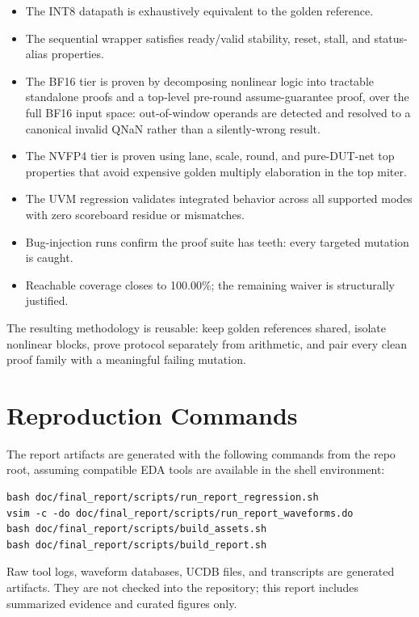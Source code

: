 \documentclass[11pt,oneside]{report}
\newcommand{\artifactnote}{Raw tool logs, waveform databases, UCDB files, and transcripts are generated artifacts. They are not checked into the repository; this report includes summarized evidence and curated figures only.}
\begin{document}
\begin{itemize}
  \item The INT8 datapath is exhaustively equivalent to the golden reference.
  \item The sequential wrapper satisfies ready/valid stability, reset, stall,
        and status-alias properties.
  \item The BF16 tier is proven by decomposing nonlinear logic into tractable
        standalone proofs and a top-level pre-round assume-guarantee proof, over
        the full BF16 input space: out-of-window operands are detected and
        resolved to a canonical invalid QNaN rather than a silently-wrong result.
  \item The NVFP4 tier is proven using lane, scale, round, and pure-DUT-net top
        properties that avoid expensive golden multiply elaboration in the top
        miter.
  \item The UVM regression validates integrated behavior across all supported
        modes with zero scoreboard residue or mismatches.
  \item Bug-injection runs confirm the proof suite has teeth: every targeted
        mutation is caught.
  \item Reachable coverage closes to 100.00\%; the remaining waiver is
        structurally justified.
\end{itemize}

The resulting methodology is reusable: keep golden references shared, isolate
nonlinear blocks, prove protocol separately from arithmetic, and pair every
clean proof family with a meaningful failing mutation.

\appendix
\chapter{Reproduction Commands}

The report artifacts are generated with the following commands from the repo
root, assuming compatible EDA tools are available in the shell environment:

\begin{lstlisting}[style=shell,caption={Report evidence and PDF build commands}]
bash doc/final_report/scripts/run_report_regression.sh
vsim -c -do doc/final_report/scripts/run_report_waveforms.do
bash doc/final_report/scripts/build_assets.sh
bash doc/final_report/scripts/build_report.sh
\end{lstlisting}

\artifactnote
\end{document}
